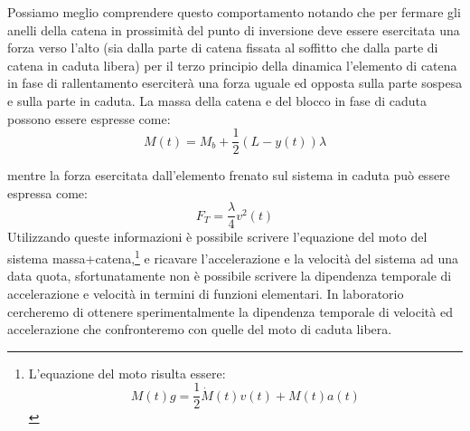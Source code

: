 \documentclass[a4paper,10pt,oneside]{article}
\begin{document}
Possiamo meglio comprendere questo comportamento notando che per fermare gli anelli della catena in prossimità del punto di inversione deve essere esercitata una forza verso l'alto (sia dalla parte di catena fissata al soffitto che dalla parte di catena in caduta libera) per il terzo principio della dinamica l'elemento di catena in fase di rallentamento eserciterà una forza uguale ed opposta sulla parte sospesa e sulla parte in caduta. La massa della catena e del blocco in fase di caduta possono essere espresse come:
\begin{equation}
 M(t)=M_b+\frac{1}{2}(L-y(t))\lambda
\end{equation}

mentre la forza esercitata dall'elemento frenato sul sistema in caduta può essere espressa come:
\begin{equation}
 F_T=\frac{\lambda}{4}v^2(t)
\end{equation}
Utilizzando queste informazioni è possibile scrivere l'equazione del moto del sistema massa+catena,\footnote{L'equazione del moto risulta essere: 
\begin{equation}
 M(t)g=\frac 1 2 \dot{M}(t)v(t)+M(t)a(t)
\end{equation}
}
e ricavare l'accelerazione e la velocità del sistema ad una data quota, sfortunatamente non è possibile scrivere la dipendenza temporale di accelerazione e velocità in termini di funzioni elementari. In laboratorio cercheremo di ottenere sperimentalmente la dipendenza temporale di velocità ed accelerazione che confronteremo con quelle del moto di caduta libera.
\end{document}
